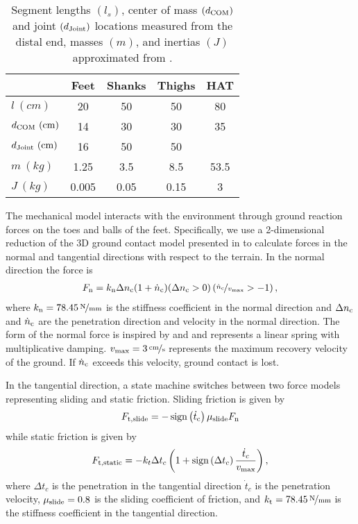 \begin{table}[b]
  \centering
      \begin{tabular}{lcccc}
        \toprule
        & Feet & Shanks & Thighs & HAT \\
        \midrule
        $l         \ (\unit{cm})$ & 20    & 50   & 50   & 80   \\
        $d_\tn{COM}   \ (\unit{cm})$ & 14    & 30   & 30   & 35   \\
        $d_\tn{Joint} \ (\unit{cm})$ & 16    & 50   & 50   &      \\
        $m         \ (\unit{kg})$ & 1.25  & 3.5  & 8.5  & 53.5 \\
        $J         \ (\unit{kg})$ & 0.005 & 0.05 & 0.15 & 3    \\
        \bottomrule
      \end{tabular}
  \caption{Segment lengths $(l_s)$, center of mass $(d_{\mathrm{COM}})$ and joint
  $(d_{\mathrm{Joint}})$ locations measured from the distal end, masses $(m)$, and
  inertias $(J)$ approximated from
  \citet{gunther2003synthesis}.}\label{tab:model_mech_params}
\end{table}

The mechanical model interacts with the environment through ground reaction
forces on the toes and balls of the feet. Specifically, we use a 2-dimensional
reduction of the 3D ground contact model presented in
\citet{song2013generalization} to calculate forces in the normal and
tangential directions with respect to the terrain. In the normal direction the
force is
\begin{align}
    F_{\mathrm{n}} = k_{\mathrm{n}} \Delta n_{\mathrm{c}} (1 + \dot n_{\mathrm{c}}) 
        (\Delta n_{\mathrm{c}} > 0)
    \left(\nicefrac{\dot n_{\mathrm{c}}}{v_{\mathrm{max}}} > -1 \right),
    \label{eq:grf_n}
\end{align}
where $k_\tn{n} = \unitfrac[78.45]{N}{mm}$ is the stiffness coefficient in the
normal direction and $\Delta n_{\mathrm{c}}$ and $\dot n_{\mathrm{c}}$ are the penetration
direction and velocity in the normal direction. The form of the normal force is
inspired by \citet{gunther2003synthesis} and \citet{scott1993biomechanical} and
represents a linear spring with multiplicative damping.  $v_\tn{max} =
\unitfrac[3]{cm}{s}$ represents the maximum recovery velocity of the ground. If
$\dot n_{\mathrm{c}}$ exceeds this velocity, ground contact is lost.

In the tangential direction, a state machine switches between two force models
representing sliding and static friction. Sliding friction is given by
\begin{align}
    F_{\tn{t,slide}} = -\func{sign}{\dot t_\tn{c}} \mu_\tn{slide} F_\tn{n}
\end{align}
while static friction is given by
\begin{align}
    F_{\tn{t,static}} = -k_t \Delta t_c \left(1 + \func{sign}{\Delta t_c}
    \frac{\dot t_c}{v_\tn{max}} \right),
\end{align}
where $\Delta t_c$ is the penetration in the tangential direction $\dot t_c$ is
the penetration velocity, $\mu_{\mathrm{slide}} = 0.8$ is the sliding coefficient of
friction, and $k_\tn{t} =\unitfrac[78.45]{N}{mm}$ is the stiffness coefficient
in the tangential direction.

